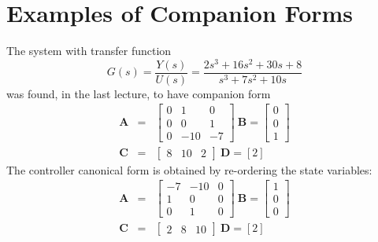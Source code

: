 \begin{slide}
\label{slide:l5s} 
\end{slide}

\section*{Examples of Companion Forms}
The system with transfer function
\[G(s)=\frac{Y(s)}{U(s)}=\frac{2s^3 + 16s^2 + 30s + 8}{s^3 + 7s^2 + 10s}\]
was found, in the last lecture, to have companion form
\begin{eqnarray*}\mathbf{A} & = & \left[\begin{array}{ccc}
  0 & 1 & 0 \\
  0 & 0 & 1 \\
  0 & -10 & -7
\end{array}\right]\ \mathbf{B}=\left[\begin{array}{c}
  0 \\
  0 \\
  1
\end{array}\right]\\ \mathbf{C} & = & \left[\begin{array}{ccc}
  8 & 10 & 2
\end{array}\right]\ \mathbf{D}=\left[2\right]\end{eqnarray*}
The controller canonical form is obtained by re-ordering the state
variables:
\begin{eqnarray*}\mathbf{A} & = & \left[\begin{array}{ccc}
  -7 & -10 & 0 \\
  1 & 0 & 0 \\
  0 & 1 & 0
\end{array}\right]\ \mathbf{B}=\left[\begin{array}{c}
  1 \\
  0 \\
  0
\end{array}\right]\\ \mathbf{C} & = & \left[\begin{array}{ccc}
  2 & 8 & 10
\end{array}\right]\ \mathbf{D}=\left[2\right]\end{eqnarray*}
